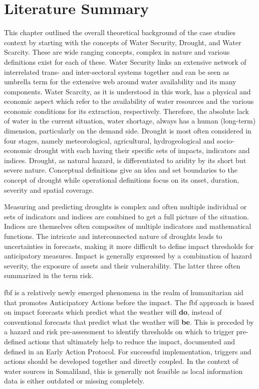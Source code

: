 \section{Literature Summary}

This chapter outlined the overall theoretical background of the case studies context by starting with the concepts of Water Security, Drought, and Water Scarcity. These are wide ranging concepts, complex in nature and various definitions exist for each of these. Water Security links an extensive network of interrelated trans- and inter-sectoral systems together and can be seen as umbrella term for the extensive web around water availability and its many components. Water Scarcity, as it is understood in this work, has a physical and economic aspect which refer to the availability of water resources and the various economic conditions for its extraction, respectively. Therefore, the absolute lack of water in the current situation, water shortage, always has a human (long-term) dimension, particularly on the demand side. Drought is most often considered in four stages, namely meteorological, agricultural, hydrogeological and socio-economic drought with each having their specific sets of impacts, indicators and indices. Drought, as natural hazard, is differentiated to aridity by its short but severe nature. Conceptual definitions give an idea and set boundaries to the concept of drought while operational definitions focus on its onset, duration, severity and spatial coverage.

Measuring and predicting droughts is complex and often multiple individual or sets of indicators and indices are combined to get a full picture of the situation. Indices are themselves often composites of multiple indicators and mathematical functions. The intricate and interconnected nature of droughts leads to uncertainties in forecasts, making it more difficult to define impact thresholds for anticipatory measures. Impact is generally expressed by a combination of hazard severity, the exposure of assets and their vulnerability. The latter three often summarized in the term risk.

\acrfull{fbf} is a relatively newly emerged phenomena in the realm of humanitarian aid that promotes Anticipatory Actions before the impact. The \acrshort{fbf} approach is based on impact forecasts which predict what the weather will \textbf{do}, instead of conventional forecasts that predict what the weather will \textbf{be}. This is preceded by a hazard and risk pre-assessment to identify thresholds on which to trigger pre-defined actions that ultimately help to reduce the impact, documented and defined in an Early Action Protocol. For successful implementation, triggers and actions should be developed together and directly coupled. In the context of water sources in Somaliland, this is generally not feasible as local information data is either outdated or missing completely.

